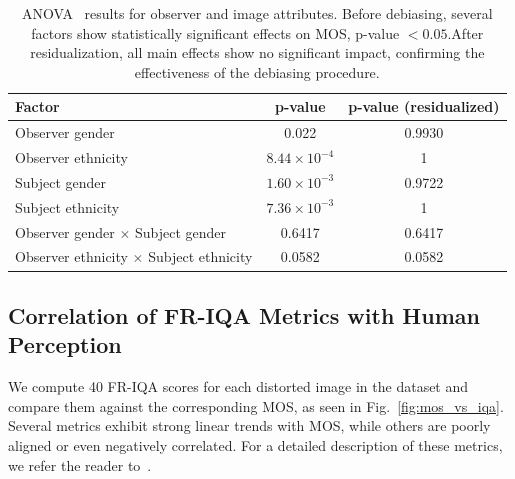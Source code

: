 \begin{table}
    \centering
    \caption{ANOVA~\cite{ross2017one} results for observer and image attributes. Before debiasing, several factors show statistically significant effects on MOS, p-value $< 0.05$.\@ After residualization, all main effects show no significant impact, confirming the effectiveness of the debiasing procedure.}\label{tab:anova}
    \begin{tabular}{lcc}
        \toprule
        Factor & p-value & p-value (residualized) \\
        \midrule
        Observer gender                             & 0.022                 & 0.9930 \\
        Observer ethnicity                          & $8.44 \times 10^{-4}$ & 1 \\
        Subject gender                              & $1.60 \times 10^{-3}$ & 0.9722 \\
        Subject ethnicity                           & $7.36 \times 10^{-3}$ & 1 \\
        Observer gender $\times$ Subject gender     & 0.6417              & 0.6417 \\
        Observer ethnicity $\times$ Subject ethnicity & 0.0582              & 0.0582 \\
        \bottomrule
    \end{tabular}
\end{table}

\subsection{Correlation of FR-IQA Metrics with Human Perception}

We compute 40 FR-IQA scores for each distorted image in the dataset and compare them against the corresponding MOS, as seen in Fig.~\ref{fig:mos_vs_iqa}. Several metrics exhibit strong linear trends with MOS, while others are poorly aligned or even negatively correlated. For a detailed description of these metrics, we refer the reader to~\cite{shahrukh2019survey}.



